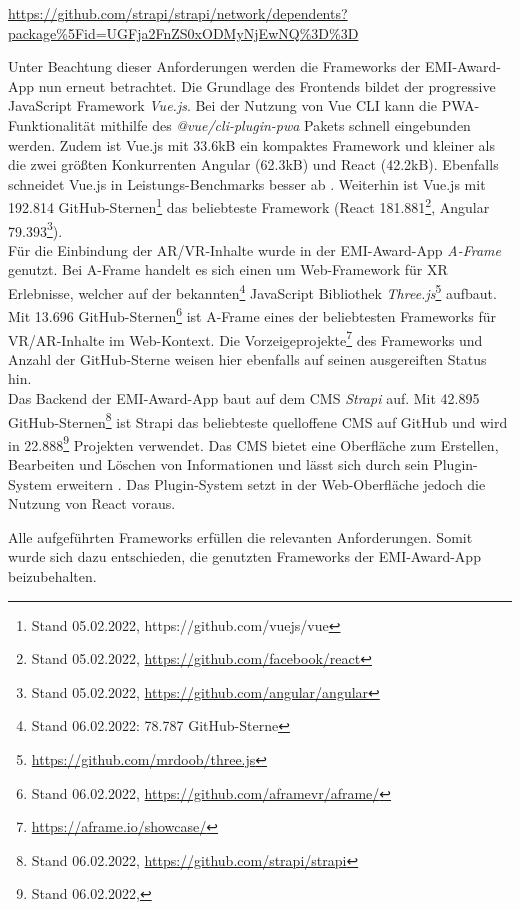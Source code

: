 \urldef\strapidep\url{https://github.com/strapi/strapi/network/dependents?package%5Fid=UGFja2FnZS0xODMyNjEwNQ%3D%3D}

Unter Beachtung dieser Anforderungen werden die Frameworks der EMI-Award-App nun
erneut betrachtet. Die Grundlage des Frontends bildet der progressive JavaScript
Framework \textit{Vue.js}. Bei der Nutzung von Vue CLI kann die
PWA-Funktionalität mithilfe des \textit{@vue/cli-plugin-pwa} Pakets schnell
eingebunden werden. Zudem ist Vue.js mit 33.6kB \cite[{v3.2.29, minifiziert und
            komprimiert}]{Kanodia2022} ein kompaktes Framework und kleiner als die zwei
größten Konkurrenten Angular (62.3kB) und React (42.2kB). Ebenfalls schneidet
Vue.js in Leistungs-Benchmarks besser ab \cite{Krause2022}. Weiterhin ist Vue.js
mit 192.814 GitHub-Sternen\footnote{Stand 05.02.2022,
    https://github.com/vuejs/vue} das beliebteste Framework (React
181.881\footnote{Stand 05.02.2022, \url{https://github.com/facebook/react}},
Angular 79.393\footnote{Stand 05.02.2022,
    \url{https://github.com/angular/angular}}). \\
Für die Einbindung der \ac{AR}/\ac{VR}-Inhalte wurde in der EMI-Award-App
\textit{A-Frame} genutzt. Bei A-Frame handelt es sich einen um Web-Framework für
\ac{XR} Erlebnisse, welcher auf der bekannten\footnote{Stand 06.02.2022: 78.787
GitHub-Sterne} JavaScript Bibliothek
\textit{Three.js}\footnote{\url{https://github.com/mrdoob/three.js}} aufbaut.
Mit 13.696 GitHub-Sternen\footnote{Stand 06.02.2022,
\url{https://github.com/aframevr/aframe/}} ist A-Frame eines der beliebtesten
Frameworks für \ac{VR}/\ac{AR}-Inhalte im Web-Kontext. Die
Vorzeigeprojekte\footnote{\url{https://aframe.io/showcase/}} des Frameworks und
Anzahl der GitHub-Sterne weisen hier ebenfalls auf seinen ausgereiften Status
hin. \\
Das Backend der EMI-Award-App baut auf dem \ac{CMS} \textit{Strapi} auf. Mit
42.895 GitHub-Sternen\footnote{Stand 06.02.2022,
    \url{https://github.com/strapi/strapi}} ist Strapi das beliebteste quelloffene
\ac{CMS} auf GitHub und wird in 22.888\footnote{Stand 06.02.2022, \strapidep}
Projekten verwendet. Das \ac{CMS} bietet eine Oberfläche zum Erstellen,
Bearbeiten und Löschen von Informationen und lässt sich durch sein Plugin-System
erweitern \cite{Strapi2021}. Das Plugin-System setzt in der Web-Oberfläche
jedoch die Nutzung von React voraus.

Alle aufgeführten Frameworks erfüllen die relevanten Anforderungen. Somit wurde
sich dazu entschieden, die genutzten Frameworks der EMI-Award-App beizubehalten.

